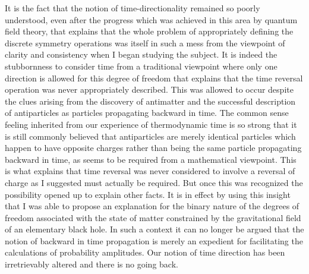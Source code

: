 \documentclass[notitlepage,12pt]{report}
\begin{document}
It is the fact that the notion of time-directionality remained so poorly understood, even after the progress which was achieved in this area by quantum field theory, that explains that the whole problem of appropriately defining the discrete symmetry operations was itself in such a mess from the viewpoint of clarity and consistency when I began studying the subject. It is indeed the stubbornness to consider time from a traditional viewpoint where only one direction is allowed for this degree of freedom that explains that the time reversal operation was never appropriately described. This was allowed to occur despite the clues arising from the discovery of antimatter and the successful description of antiparticles as particles propagating backward in time. The common sense feeling inherited from our experience of thermodynamic time is so strong that it is still commonly believed that antiparticles are merely identical particles which happen to have opposite charges rather than being the same particle propagating backward in time, as seems to be required from a mathematical viewpoint. This is what explains that time reversal was never considered to involve a reversal of charge as I suggested must actually be required. But once this was recognized the possibility opened up to explain other facts. It is in effect by using this insight that I was able to propose an explanation for the binary nature of the degrees of freedom associated with the state of matter constrained by the gravitational field of an elementary black hole. In such a context it can no longer be argued that the notion of backward in time propagation is merely an expedient for facilitating the calculations of probability amplitudes. Our notion of time direction has been irretrievably altered and there is no going back.

\newpage
{}
\end{document}
